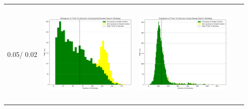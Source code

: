 \begin{landscape}
\begin{table}[h!]
\begin{tabular}{ | m{8mm} | c | c | c | c |}
    0.05/ 0.02 &
    \begin{minipage}[c][58mm][c]{48mm}
      \includegraphics[width=48mm, height=52mm]{Chapters/MultiAgentTargetDetection/Figs/Histograms/MiscalibratedSensor/05-02/05-02EpsilonGreedyHistogram.png}
    \end{minipage}
    &
    \begin{minipage}[c][58mm][c]{48mm}
      \includegraphics[width=48mm, height=52mm]{Chapters/MultiAgentTargetDetection/Figs/Histograms/MiscalibratedSensor/05-02/05-02SweepHistogram.png}


\end{minipage}
\end{tabular}
\end{table}
\end{landscape}
